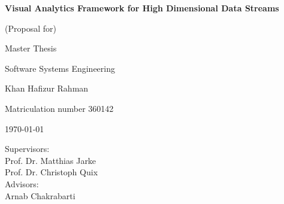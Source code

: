 \thispagestyle{empty}

\vspace*{3cm}
\centerline{{\Large\bf Visual Analytics Framework for High Dimensional Data Streams}}

\vspace*{4mm}


\vspace{2cm}

\centerline{(Proposal for)} %
\centerline{Master Thesis}
\centerline{Software Systems Engineering}

\vspace{2cm}

\centerline{{\large Khan Hafizur Rahman}}
\centerline{Matriculation number 360142}

\vspace{10mm}

\centerline{\today}

\vspace{10mm}

\begin{center}
\begin{minipage}[t]{8cm}
Supervisors: \\
\hspace*{2cm} Prof. Dr. Matthias Jarke \\
\hspace*{2cm} Prof. Dr. Christoph Quix\\[1cm]
Advisors: \\
\hspace*{2cm} Arnab Chakrabarti \\
\end{minipage}
\end{center}
